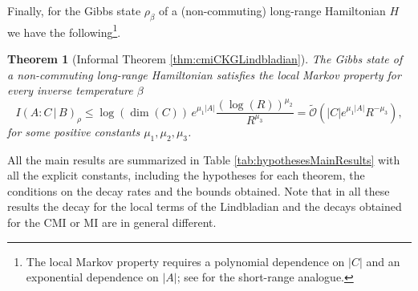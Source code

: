 \documentclass[11pt]{article}
\numberwithin{equation}{section}
\numberwithin{figure}{section}
\numberwithin{table}{section}
\theoremstyle{definition}
\theoremstyle{plain}
\newtheorem{thm}{Theorem}[section]
\theoremstyle{remark}
\newcommand{\abs}[1]{\left \vert#1\right\vert}
\begin{document}
Finally, for the Gibbs state $\rho_\beta$ of a (non-commuting) long-range Hamiltonian $H$ we have the following\footnote{The local Markov property requires a polynomial dependence on $\abs{C}$ and an exponential dependence on $\abs{A}$; see \cite{chen_quantum_2025} for the short-range analogue.}.
\medskip
\begin{thm}[Informal Theorem \ref{thm:cmiCKGLindbladian}]\label{thm:informalCMICKGLindbladian}
    The Gibbs state of a non-commuting long-range Hamiltonian satisfies the local Markov property for every inverse temperature $\beta $
\begin{equation}
    I(A : C \,|\, B)_\rho \le \log(\dim(C)) \,e^{\mu_1 \abs{A}} \dfrac{(\log (R))^{\mu_2}}{R^{\mu_3}} =\tilde{\mathcal{O}}(\abs{C}e^{\mu_1 \abs{A}}R^{-\mu_3}),
\end{equation}
for some positive constants $\mu_1,\mu_2,\mu_3$.
\end{thm}

All the main results are summarized in Table \ref{tab:hypothesesMainResults} with all the explicit constants, including the hypotheses for each theorem, the conditions on the decay rates and the bounds obtained. Note that in all these results the decay for the local terms of the Lindbladian and the decays obtained for the CMI or MI are in general different. 
\end{document}
